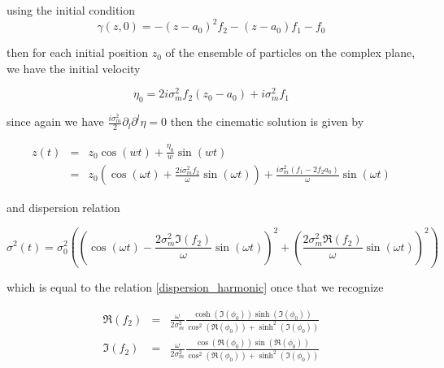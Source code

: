 \documentclass[a4paper,12pt]{article}
\begin{document}
using the initial condition 
\begin{equation}
\gamma(z,0) = -(z-a_0)^2 f_2 - (z-a_0) f_1 - f_0
\end{equation} 

then for each initial position $z_0$ of the ensemble of particles  on the complex plane, we have the initial velocity

\begin{equation}
\eta_0 = 2 i \sigma_m^2 f_2 (z_0 - a_0) + i \sigma_m^2 f_1
\end{equation}

since again we have $\frac{i\sigma_m^2}{2 } \partial_l \partial^l \eta = 0$ then the cinematic solution is given by

\begin{eqnarray}
z(t) & = & z_0 \cos(wt) + \frac{\eta_0}{w} \sin(wt) \nonumber \\
& = & z_0 \left(  \cos(\omega t) + \frac{2i\sigma_m^2f_2}{\omega} \sin(\omega t)\right) + \frac{i \sigma_m^2 (f_1 -2f_2a_0)}{\omega}\sin(\omega t)
\end{eqnarray}

and dispersion relation

\begin{equation}
\sigma^2(t) = \sigma_0^2\left( \left( \cos(\omega t) - \frac{2\sigma_m^2\Im(f_2)}{\omega} \sin(\omega t) \right)^2 + \left( \frac{2\sigma_m^2\Re(f_2)}{\omega} \sin(\omega t)  \right)^2 \right)
\end{equation}
 
which is equal to the relation \ref{dispersion_harmonic} once that we recognize 

\begin{eqnarray}
\Re(f_2) & = & \frac{\omega}{2\sigma_m^2} \frac{\cosh(\Im(\phi_0)) \sinh(\Im(\phi_0))}{\cos^2(\Re(\phi_0)) + \sinh^2(\Im(\phi_0))}  \\
\Im(f_2) & = & \frac{\omega}{2\sigma_m^2} \frac{\cos(\Re(\phi_0)) \sin(\Re(\phi_0))}{\cos^2(\Re(\phi_0)) + \sinh^2(\Im(\phi_0))} 
\end{eqnarray}

\printbibliography
\end{document}

